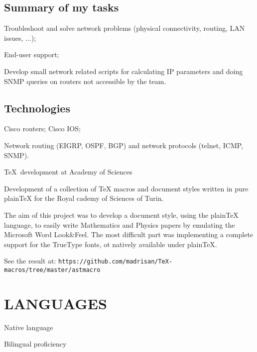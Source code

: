 \subsection{Summary of my tasks}

\item{\bdot} Troubleshoot and solve network problems (physical connectivity, 
   routing, LAN issues, $\dots$);
\item{\bdot} End-user support;
\item{\bdot} Develop small network related scripts for calculating IP parameters
   and doing SNMP queries on routers not accessible by the team.

\subsection{Technologies}

\item{\bdot} Cisco routers; Cisco IOS;
\item{\bdot} Network routing (EIGRP, OSPF, BGP) 
   and network protocols (telnet, ICMP, SNMP).
   

\bigskip
{}
   {\TeX\ development at Academy of Sciences}

\noindent
Development of a collection of TeX macros and document styles written in pure plainTeX
for the Royal cademy of Sciences of Turin.

The aim of this project was to develop a document style, using the plainTeX language, 
to easily write Mathematics and Physics papers by emulating the Microsoft Word 
Look\&Feel.
The most difficult part was implementing a complete support for the TrueType fonts,
ot natively available under plain\TeX.

See the result at:
\hfill\break\noindent
{\tt https:/\negthinspace/github.com/madrisan/TeX-macros/tree/master/astmacro}


\section{LANGUAGES}

Native language

Bilingual proficiency

